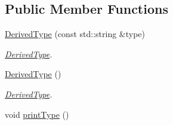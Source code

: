 \subsection*{Public Member Functions}
\begin{DoxyCompactItemize}
\item 
\hyperlink{class_a_p_i2_1_1_derived_type_a056bbd585fca7b3882405659c85b36d8}{Derived\-Type} (const std\-::string \&type)
\begin{DoxyCompactList}\small\item\em \hyperlink{class_a_p_i2_1_1_derived_type}{Derived\-Type}. \end{DoxyCompactList}\item 
\hypertarget{class_a_p_i2_1_1_derived_type_a68d4075cacb593552c94782f0fd9c522}{\hyperlink{class_a_p_i2_1_1_derived_type_a68d4075cacb593552c94782f0fd9c522}{Derived\-Type} ()}\label{class_a_p_i2_1_1_derived_type_a68d4075cacb593552c94782f0fd9c522}

\begin{DoxyCompactList}\small\item\em \hyperlink{class_a_p_i2_1_1_derived_type}{Derived\-Type}. \end{DoxyCompactList}\item 
\hypertarget{class_a_p_i2_1_1_derived_type_aefe2b5f9a59fe42cfaa11325e29c06c8}{void \hyperlink{class_a_p_i2_1_1_derived_type_aefe2b5f9a59fe42cfaa11325e29c06c8}{print\-Type} ()}\label{class_a_p_i2_1_1_derived_type_aefe2b5f9a59fe42cfaa11325e29c06c8}


\end{DoxyCompactItemize}
